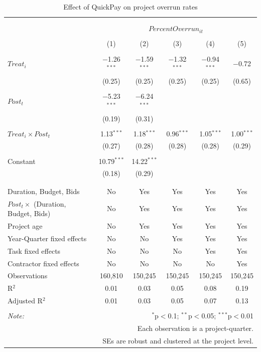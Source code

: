 \documentclass[
]{article}
\begin{document}
\begin{table}[H] \centering 
  \caption{Effect of QuickPay on project overrun rates} 
  \label{} 
\small 
\begin{tabular}{@{\extracolsep{-2pt}}lccccc} 
\\[-1.8ex]\hline 
\hline \\[-1.8ex] 
\\[-1.8ex] & \multicolumn{5}{c}{$PercentOverrun_{it}$} \\ 
\\[-1.8ex] & (1) & (2) & (3) & (4) & (5)\\ 
\hline \\[-1.8ex] 
 $Treat_i$ & $-$1.26$^{***}$ & $-$1.59$^{***}$ & $-$1.32$^{***}$ & $-$0.94$^{***}$ & $-$0.72 \\ 
  & (0.25) & (0.25) & (0.25) & (0.25) & (0.65) \\ 
  & & & & & \\ 
 $Post_t$ & $-$5.23$^{***}$ & $-$6.24$^{***}$ &  &  &  \\ 
  & (0.19) & (0.31) &  &  &  \\ 
  & & & & & \\ 
 $Treat_i \times Post_t$ & 1.13$^{***}$ & 1.18$^{***}$ & 0.96$^{***}$ & 1.05$^{***}$ & 1.00$^{***}$ \\ 
  & (0.27) & (0.28) & (0.28) & (0.28) & (0.29) \\ 
  & & & & & \\ 
 Constant & 10.79$^{***}$ & 14.22$^{***}$ &  &  &  \\ 
  & (0.18) & (0.29) &  &  &  \\ 
  & & & & & \\ 
\hline \\[-1.8ex] 
Duration, Budget, Bids & No & Yes & Yes & Yes & Yes \\ 
$Post_t \times$  (Duration, Budget, Bids) & No & Yes & Yes & Yes & Yes \\ 
Project age & No & Yes & Yes & Yes & Yes \\ 
Year-Quarter fixed effects & No & No & Yes & Yes & Yes \\ 
Task fixed effects & No & No & No & Yes & Yes \\ 
Contractor fixed effects & No & No & No & No & Yes \\ 
Observations & 160,810 & 150,245 & 150,245 & 150,245 & 150,245 \\ 
R$^{2}$ & 0.01 & 0.03 & 0.05 & 0.08 & 0.19 \\ 
Adjusted R$^{2}$ & 0.01 & 0.03 & 0.05 & 0.07 & 0.13 \\ 
\hline 
\hline \\[-1.8ex] 
\textit{Note:}  & \multicolumn{5}{r}{$^{*}$p$<$0.1; $^{**}$p$<$0.05; $^{***}$p$<$0.01} \\ 
 & \multicolumn{5}{r}{Each observation is a project-quarter.} \\ 
 & \multicolumn{5}{r}{SEs are robust and clustered at the project level.} \\ 
\end{tabular} 
\end{table}
\end{document}
